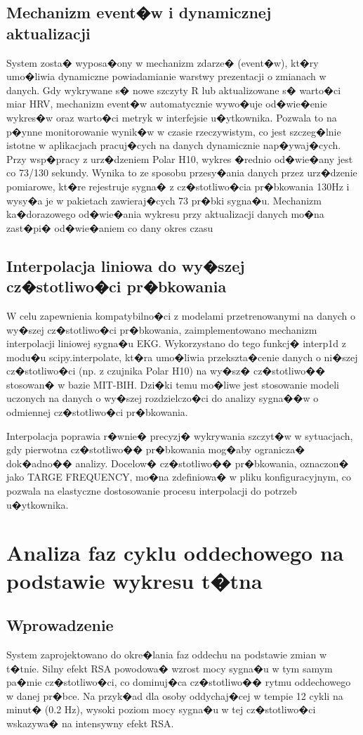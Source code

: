 \subsection{Mechanizm event�w i dynamicznej aktualizacji}
System zosta� wyposa�ony w mechanizm zdarze� (event�w), kt�ry umo�liwia
dynamiczne powiadamianie warstwy prezentacji o zmianach w danych. Gdy wykrywane
s� nowe szczyty R lub aktualizowane s� warto�ci miar HRV, mechanizm event�w
automatycznie wywo�uje od�wie�enie wykres�w oraz warto�ci metryk w interfejsie
u�ytkownika. Pozwala to na p�ynne monitorowanie wynik�w w czasie rzeczywistym,
co jest szczeg�lnie istotne w aplikacjach pracuj�cych na danych dynamicznie
nap�ywaj�cych. Przy wsp�pracy z urz�dzeniem Polar H10, wykres �rednio
od�wie�any jest co 73/130 sekundy. Wynika to ze sposobu przesy�ania danych
przez urz�dzenie pomiarowe, kt�re rejestruje sygna� z cz�stotliwo�cia
pr�bkowania 130Hz i wysy�a je w pakietach zawieraj�cych 73 pr�bki sygna�u.
Mechanizm ka�dorazowego od�wie�ania wykresu przy aktualizacji danych mo�na
zast�pi� od�wie�aniem co dany okres czasu

\subsection{Interpolacja liniowa do wy�szej cz�stotliwo�ci pr�bkowania}
W celu zapewnienia kompatybilno�ci z modelami przetrenowanymi na danych o
wy�szej cz�stotliwo�ci pr�bkowania, zaimplementowano mechanizm interpolacji
liniowej sygna�u EKG. Wykorzystano do tego funkcj� interp1d z modu�u
scipy.interpolate, kt�ra umo�liwia przekszta�cenie danych o ni�szej
cz�stotliwo�ci (np. z czujnika Polar H10) na wy�sz� cz�stotliwo�� stosowan� w
bazie MIT-BIH. Dzi�ki temu mo�liwe jest stosowanie modeli uczonych na danych o
wy�szej rozdzielczo�ci do analizy sygna��w o odmiennej cz�stotliwo�ci
pr�bkowania.

Interpolacja poprawia r�wnie� precyzj� wykrywania szczyt�w w sytuacjach, gdy
pierwotna cz�stotliwo�� pr�bkowania mog�aby ogranicza� dok�adno�� analizy.
Docelow� cz�stotliwo�� pr�bkowania, oznaczon� jako TARGE FREQUENCY, mo�na
zdefiniowa� w pliku konfiguracyjnym, co pozwala na elastyczne dostosowanie
procesu interpolacji do potrzeb u�ytkownika.

\section{Analiza faz cyklu oddechowego na podstawie wykresu t�tna}

\subsection{Wprowadzenie}
System zaprojektowano do okre�lania faz oddechu na podstawie zmian w t�tnie.
Silny efekt RSA powodowa� wzrost mocy sygna�u w tym samym pa�mie
cz�stotliwo�ci, co dominuj�ca cz�stotliwo�� rytmu oddechowego w danej pr�bce.
Na przyk�ad dla osoby oddychaj�cej w tempie 12 cykli na minut� (0.2 Hz), wysoki
poziom mocy sygna�u w tej cz�stotliwo�ci wskazywa� na intensywny efekt RSA.

